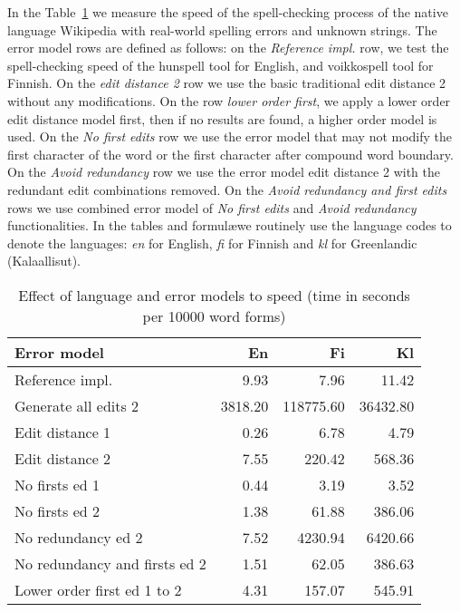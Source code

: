 \documentclass[11pt]{article}
\begin{document}
In the Table~\ref{table:error-model-vs-language-speed} we measure the speed of
the spell-checking process of the native language Wikipedia with real-world
spelling errors and unknown strings. The error model rows are defined as
follows: on the \emph{Reference impl.} row, we test the spell-checking speed of
the hunspell tool for English, and voikkospell tool for Finnish. On the
\emph{edit distance 2} row we use the basic traditional edit distance 2 without
any modifications. On the row \emph{lower order first}, we apply a
lower order edit distance model first, then if no results are found,
a higher order model is used. On the \emph{No first edits} row we
use the error model that may not modify the first character of the word or the
first character after compound word boundary. On the \emph{Avoid redundancy}
row we use the error model edit distance 2 with the redundant edit combinations
removed. On the \emph{Avoid redundancy and first edits} rows we use combined
error model of \emph{No first edits} and \emph{Avoid redundancy}
functionalities.  In the tables and formul\ae we routinely use the language
codes to denote the languages: \emph{en} for English, \emph{fi} for Finnish and
\emph{kl} for Greenlandic (Kalaallisut). 

\begin{table}[h]
\begin{center}
\begin{scriptsize}
\begin{tabular}{|l|rrr|}
\hline
\bf Error model & \bf En & \bf Fi & \bf Kl \\ 
\hline
Reference impl. &
9.93&7.96&11.42
\\
Generate all edits 2 & 
3818.20&118775.60&36432.80
\\
\hline
Edit distance 1 &
0.26&6.78&4.79
\\
Edit distance 2 &
7.55&220.42&568.36
\\
No firsts ed 1 & 
0.44&3.19&3.52
\\
No firsts ed 2 &
1.38&61.88&386.06
\\
No redundancy ed 2 &
7.52&4230.94&6420.66
\\
No redundancy and firsts ed 2 &
1.51&62.05&386.63
\\
Lower order first ed 1 to 2 &
4.31&157.07&545.91
\\
\hline
\end{tabular}
\end{scriptsize}
\end{center}
\caption{\label{table:error-model-vs-language-speed} Effect of language and 
error models to speed (time in seconds per 10000 word forms)}
\end{table}
\end{document}
